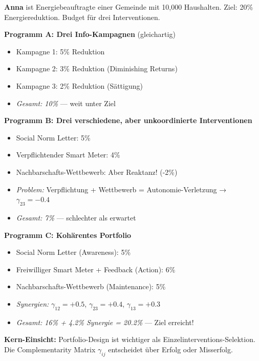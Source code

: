 \begin{tcolorbox}[colback=yellow!5!white, colframe=yellow!75!black,
    title=Intuition: Anna's drei Energie-Programme]

\textbf{Anna} ist Energiebeauftragte einer Gemeinde mit 10,000 Haushalten. Ziel: 20\% Energiereduktion. Budget für drei Interventionen.

\textbf{Programm A: Drei Info-Kampagnen} (gleichartig)
\begin{itemize}[nosep]
\item Kampagne 1: 5\% Reduktion
\item Kampagne 2: 3\% Reduktion (Diminishing Returns)
\item Kampagne 3: 2\% Reduktion (Sättigung)
\item \textit{Gesamt: 10\%} --- weit unter Ziel
\end{itemize}

\textbf{Programm B: Drei verschiedene, aber unkoordinierte Interventionen}
\begin{itemize}[nosep]
\item Social Norm Letter: 5\%
\item Verpflichtender Smart Meter: 4\%
\item Nachbarschafts-Wettbewerb: Aber Reaktanz! (-2\%)
\item \textit{Problem:} Verpflichtung + Wettbewerb = Autonomie-Verletzung → $\gamma_{23} = -0.4$
\item \textit{Gesamt: 7\%} --- schlechter als erwartet
\end{itemize}

\textbf{Programm C: Kohärentes Portfolio}
\begin{itemize}[nosep]
\item Social Norm Letter (Awareness): 5\%
\item Freiwilliger Smart Meter + Feedback (Action): 6\%
\item Nachbarschafts-Wettbewerb (Maintenance): 5\%
\item \textit{Synergien:} $\gamma_{12} = +0.5$, $\gamma_{23} = +0.4$, $\gamma_{13} = +0.3$
\item \textit{Gesamt: 16\% + 4.2\% Synergie = 20.2\%} --- Ziel erreicht!
\end{itemize}

\textbf{Kern-Einsicht:} Portfolio-Design ist wichtiger als Einzelinterventions-Selektion. Die Complementarity Matrix $\gamma_{ij}$ entscheidet über Erfolg oder Misserfolg.
\end{tcolorbox}

